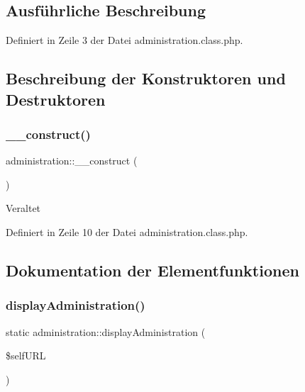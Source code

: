 \subsection{Ausführliche Beschreibung}


Definiert in Zeile 3 der Datei administration.\+class.\+php.



\subsection{Beschreibung der Konstruktoren und Destruktoren}
\mbox{\label{classadministration_a68add3e03abc47be850569bb51b112e7}} 
\subsubsection{\texorpdfstring{\+\_\+\+\_\+construct()}{\_\_construct()}}
{\footnotesize\ttfamily administration\+::\+\_\+\+\_\+construct (\begin{DoxyParamCaption}{ }\end{DoxyParamCaption})}

\begin{DoxyRefDesc}{Veraltet}
\item[\mbox{\hyperlink{deprecated__deprecated000038}{Veraltet}}]\end{DoxyRefDesc}


Definiert in Zeile 10 der Datei administration.\+class.\+php.



\subsection{Dokumentation der Elementfunktionen}
\mbox{\label{classadministration_ab831a59891053402578ba3a98ec57b30}} 
\subsubsection{\texorpdfstring{display\+Administration()}{displayAdministration()}}
{\footnotesize\ttfamily static administration\+::display\+Administration (\begin{DoxyParamCaption}\item[{}]{\$self\+U\+RL }\end{DoxyParamCaption})\hspace{0.3cm}{\ttfamily [static]}}

